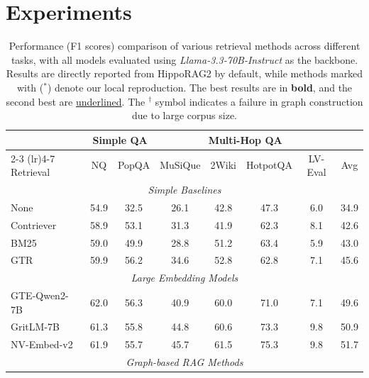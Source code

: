 \section{Experiments}

\begin{table}[t!]
    \centering
    \caption{Performance (F1 scores) comparison of various retrieval methods across different tasks, with all models evaluated using \textit{Llama-3.3-70B-Instruct} as the backbone. Results are directly reported from HippoRAG2 \cite{gutierrez2025rag} by default, while methods marked with ($^*$) denote our local reproduction. The best results are in \textbf{bold}, and the second best are \underline{underlined}. The $^\dagger$ symbol indicates a failure in graph construction due to large corpus size.}    \label{tab:results}
    \small
    \vspace{-5pt}
    \begin{tabular}{l cccccc c}
        \toprule
        & \multicolumn{2}{c}{Simple QA} & \multicolumn{4}{c}{Multi-Hop QA} & \\
        \cmidrule(lr){2-3} \cmidrule(lr){4-7}
        Retrieval & NQ & PopQA & MuSiQue & 2Wiki & HotpotQA & LV-Eval & Avg \\
        \midrule
        \multicolumn{8}{c}{\textit{Simple Baselines}} \\
        \midrule
        None & 54.9 & 32.5 & 26.1 & 42.8 & 47.3 & 6.0 & 34.9 \\
        Contriever \cite{izacard2021unsupervised} & 58.9 & 53.1 & 31.3 & 41.9 & 62.3 & 8.1 & 42.6 \\
        BM25 \cite{robertson1994some} & 59.0 & 49.9 & 28.8 & 51.2 & 63.4 & 5.9 & 43.0 \\
        GTR \cite{ni2022large} & 59.9 & 56.2 & 34.6 & 52.8 & 62.8 & 7.1 & 45.6 \\
        \midrule
        \multicolumn{8}{c}{\textit{Large Embedding Models}} \\
        \midrule
        GTE-Qwen2-7B \cite{ni2022large} & 62.0 & 56.3 & 40.9 & 60.0 & 71.0 & 7.1 & 49.6 \\
        GritLM-7B \cite{muennighoff2024generative} & 61.3 & 55.8 & 44.8 & 60.6 & 73.3 & 9.8 & 50.9 \\
        NV-Embed-v2 \cite{lee2024nv} & 61.9 & 55.7 & 45.7 & 61.5 & 75.3 & 9.8 & 51.7 \\
        \midrule
        \multicolumn{8}{c}{\textit{Graph-based RAG Methods}} \\
        \midrule

\end{tabular}
\end{table}

